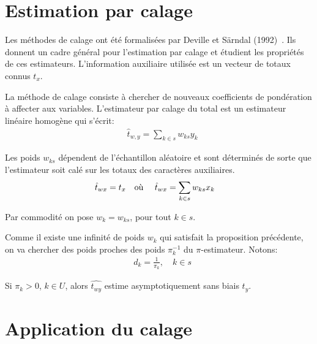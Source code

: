 \section{Estimation par calage}

Les méthodes de calage ont été formalisées par Deville et Särndal (1992)~\cite{alrifaieCompressionBehaviorThreedimensional2019}. Ils donnent un cadre général pour l'estimation par calage et étudient les propriétés de ces estimateurs. L'information auxiliaire utilisée est un vecteur de totaux connus $t_{x}$.

\begin{definition}
La méthode de calage consiste à chercher de nouveaux coefficients de pondération à affecter aux variables.
L'estimateur par calage du total est un estimateur linéaire homogène qui s'écrit:
\begin{align*}
& \hat{t}_{w,y}=\sum_{k\in s} w_{ks}y_k
\end{align*}
\end{definition}

\begin{proposition}[]
Les poids $w_{ks}$ dépendent de l'échantillon aléatoire et sont déterminés de sorte que l'estimateur soit calé sur les totaux des caractères auxiliaires.
\begin{align*}
& \hat{t}_{wx}=t_x \quad \textnormal{où } \quad \hat{t}_{wx}=\sum_{k\in s} w_{ks}x_k
\end{align*}
\end{proposition}

\begin{notation}
Par commodité on pose $w_k=w_{ks}$, pour tout $k\in s$.
\end{notation}

\begin{remark}
Comme il existe une infinité de poids $w_k$ qui satisfait la proposition précédente, on va chercher des poids proches des poids $\pi_k^{-1}$ du $\pi$-estimateur. Notons:
\begin{align*}
& d_k=\frac{1}{\pi_k}, \quad k\in s
\end{align*}
\end{remark}

\begin{theorem}
Si $\pi_k > 0$, $k\in U$, alors $\hat{t_{wy}}$ estime asymptotiquement sans biais $t_y$.
\end{theorem}

\section{Application du calage}

